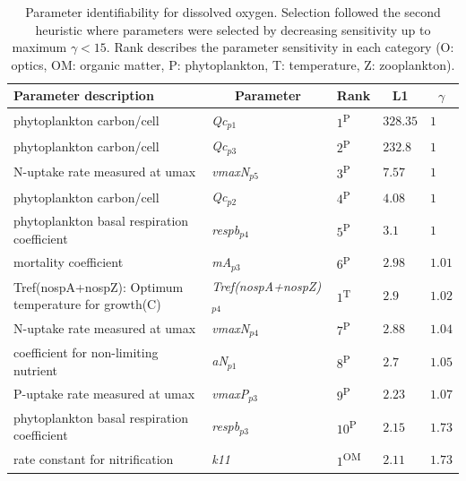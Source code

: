 \documentclass[letterpaper,12pt,oneside]{article}\usepackage[]{graphicx}\usepackage[]{color}
\begin{document}
\begin{table}[!tbp]
{\normalsize
\caption{Parameter identifiability for dissolved oxygen.  Selection followed the second heuristic where parameters were selected by decreasing sensitivity up to maximum $\gamma < 15$.  Rank describes the parameter sensitivity in each category (O: optics, OM: organic matter, P: phytoplankton, T: temperature, Z: zooplankton).\label{tab:identall1}} 
\begin{center}
\begin{tabular}{lllll}
\hline\hline
\multicolumn{1}{l}{Parameter description}&\multicolumn{1}{c}{Parameter}&\multicolumn{1}{c}{Rank}&\multicolumn{1}{c}{L1}&\multicolumn{1}{c}{$\gamma$}\tabularnewline
\hline
\footnotesize{phytoplankton carbon/cell}&\footnotesize{\textit{Qc$_{p1}$}}&$1$\textsuperscript{P}&$328.35$&$1$\tabularnewline
\footnotesize{phytoplankton carbon/cell}&\footnotesize{\textit{Qc$_{p3}$}}&$2$\textsuperscript{P}&$232.8$&$1$\tabularnewline
\footnotesize{N-uptake rate measured at umax}&\footnotesize{\textit{vmaxN$_{p5}$}}&$3$\textsuperscript{P}&$7.57$&$1$\tabularnewline
\footnotesize{phytoplankton carbon/cell}&\footnotesize{\textit{Qc$_{p2}$}}&$4$\textsuperscript{P}&$4.08$&$1$\tabularnewline
\footnotesize{phytoplankton basal respiration coefficient}&\footnotesize{\textit{respb$_{p4}$}}&$5$\textsuperscript{P}&$3.1$&$1$\tabularnewline
\footnotesize{mortality coefficient}&\footnotesize{\textit{mA$_{p3}$}}&$6$\textsuperscript{P}&$2.98$&$1.01$\tabularnewline
\footnotesize{Tref(nospA+nospZ): Optimum temperature for growth(C)}&\footnotesize{\textit{Tref(nospA+nospZ)$_{p4}$}}&$1$\textsuperscript{T}&$2.9$&$1.02$\tabularnewline
\footnotesize{N-uptake rate measured at umax}&\footnotesize{\textit{vmaxN$_{p4}$}}&$7$\textsuperscript{P}&$2.88$&$1.04$\tabularnewline
\footnotesize{coefficient for non-limiting nutrient}&\footnotesize{\textit{aN$_{p1}$}}&$8$\textsuperscript{P}&$2.7$&$1.05$\tabularnewline
\footnotesize{P-uptake rate measured at umax}&\footnotesize{\textit{vmaxP$_{p3}$}}&$9$\textsuperscript{P}&$2.23$&$1.07$\tabularnewline
\footnotesize{phytoplankton basal respiration coefficient}&\footnotesize{\textit{respb$_{p3}$}}&$10$\textsuperscript{P}&$2.15$&$1.73$\tabularnewline
\footnotesize{rate constant for nitrification}&\footnotesize{\textit{k11}}&$1$\textsuperscript{OM}&$2.11$&$1.73$\tabularnewline

\end{tabular}
\end{center}}
\end{table}
\end{document}
